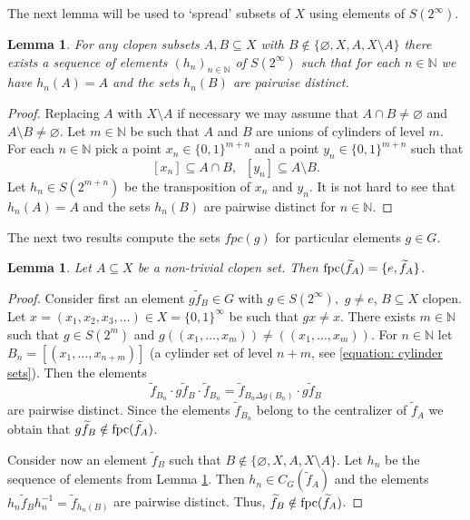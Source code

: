 \documentclass[11pt]{amsart}
\newcommand{\N}{\mathbb N}
\newcommand{\fpc}{{\rm fpc}}
\theoremstyle{plain}
\newtheorem{lemma}[theorem]{Lemma}
\theoremstyle{definition}
\theoremstyle{remark}
\numberwithin{equation}{section}
\begin{document}
The next lemma will be used to `spread' subsets of $X$ using elements of $S(2^\infty)$.
\begin{lemma}\label{lemma: tilde f_A separation}
	For any clopen subsets $A,B\subseteq X$ with $B\notin\{\varnothing, X, A, X\setminus A\}$ there exists a sequence of elements $(h_n)_{n \in \N}$ of $S(2^{\infty})$ such that for each $n \in \N$ we have $h_n(A)=A$ and the sets $h_n(B)$ are pairwise distinct.
\end{lemma}
\begin{proof} 
	Replacing $A$ with $X\setminus A$ if necessary we may assume that $A\cap B\neq\varnothing$ and $A\setminus B\neq \varnothing$. Let $m\in\mathbb N$ be such that $A$ and $B$ are unions of cylinders of level $m$. For each $n\in\mathbb N$ pick a point $x_n\in\{0,1\}^{m+n}$ and a point $y_n\in\{0,1\}^{m+n}$ such that $$[x_n]\subseteq A\cap B,\;\;[y_n]\subseteq A\setminus B.$$
	Let $h_n\in S(2^{m+n})$ be the transposition of $x_n$ and $y_n$. It is not hard to see that $h_n(A)=A$ and the sets $h_n(B)$ are pairwise distinct for $n\in\mathbb N$.
\end{proof}
The next two results compute the sets $fpc(g)$ for particular elements $g \in G$.
\begin{lemma}\label{lemma: fpc widetilde f_A}
	Let $A\subseteq X$ be a non-trivial clopen set. Then $\fpc(\widetilde f_A)=\{e,\widetilde f_A\}$.
\end{lemma}
\begin{proof}
	Consider first an element $g\tilde{f}_B\in G$ with $g\in S(2^\infty),$ $g\neq e$, $B \subseteq X$ clopen. Let $x=(x_1,x_2,x_3,\ldots)\in X=\{0,1\}^\infty$ be such that $gx\neq x$. There exists $m\in \N$ such that $g\in S(2^m)$ and $g((x_1,\ldots,x_m))\neq ((x_1,\ldots,x_m))$. For $n\in\mathbb N$ let $B_n=[(x_1,\ldots,x_{n+m})]$ (a cylinder set of level $n+m$, see \eqref{equation: cylinder sets}). Then the elements $$\widetilde f_{B_n}\cdot g\widetilde f_B\cdot\widetilde f_{B_n}=\widetilde f_{B_n\Delta g(B_n)}\cdot g\widetilde f_B$$ are pairwise distinct. Since the elements $\widetilde f_{B_n}$ belong to the centralizer of $\widetilde f_A$ we obtain that $g\widetilde f_B\notin \fpc(\widetilde f_A)$. 
	
	Consider now an element $\widetilde f_B$ such that $B\notin\{\varnothing, X, A,X\setminus A\}$. Let $h_n$ be the sequence of elements from Lemma \ref{lemma: tilde f_A separation}. Then $h_n\in C_G(\widetilde f_A)$ and the elements $h_n\widetilde f_B h_n^{-1}=\widetilde f_{h_n(B)}$ are pairwise distinct. Thus, $\widetilde f_B\notin \fpc(\widetilde f_A)$.
\end{proof}
\end{document}

